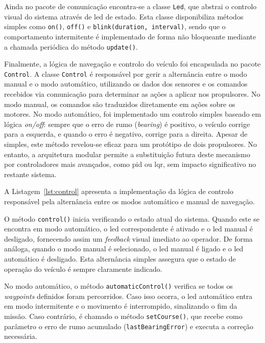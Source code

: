 Ainda no pacote de comunicação encontra-se a classe \texttt{Led}, que abstrai o controlo visual do sistema através de \gls{led} de estado. Esta classe disponibiliza métodos simples como \texttt{on()}, \texttt{off()} e \texttt{blink(duration, interval)}, sendo que o comportamento intermitente é implementado de forma não bloqueante mediante a chamada periódica do método \texttt{update()}.  

Finalmente, a lógica de navegação e controlo do veículo foi encapsulada no pacote \texttt{Control}. A classe \texttt{Control} é responsável por gerir a alternância entre o modo manual e o modo automático, utilizando os dados dos sensores e os comandos recebidos via comunicação para determinar as ações a aplicar nos propulsores. No modo manual, os comandos são traduzidos diretamente em ações sobre os motores. No modo automático, foi implementado um controlo simples baseado em lógica \emph{on/off}: sempre que o erro de rumo (\emph{bearing}) é positivo, o veículo corrige para a esquerda, e quando o erro é negativo, corrige para a direita. Apesar de simples, este método revelou-se eficaz para um protótipo de dois propulsores. No entanto, a arquitetura modular permite a substituição futura deste mecanismo por controladores mais avançados, como \acrfull{pid} ou \acrfull{lqr}, sem impacto significativo no restante sistema.  

A Listagem~\ref{lst:control} apresenta a implementação da lógica de controlo responsável pela alternância entre os modos automático e manual de navegação. 



O método \texttt{control()} inicia verificando o estado atual do sistema. Quando este se encontra em modo automático, o \gls{led} correspondente é ativado e o \gls{led} manual é desligado, fornecendo assim um \emph{feedback} visual imediato ao operador. De forma análoga, quando o modo manual é selecionado, o \gls{led} manual é ligado e o \gls{led} automático é desligado. Esta alternância simples assegura que o estado de operação do veículo é sempre claramente indicado.  

No modo automático, o método \texttt{automaticControl()} verifica se todos os \emph{waypoints} definidos foram percorridos. Caso isso ocorra, o \gls{led} automático entra em modo intermitente e o movimento é interrompido, sinalizando o fim da missão. Caso contrário, é chamado o método \texttt{setCourse()}, que recebe como parâmetro o erro de rumo acumulado (\texttt{lastBearingError}) e executa a correção necessária.  

